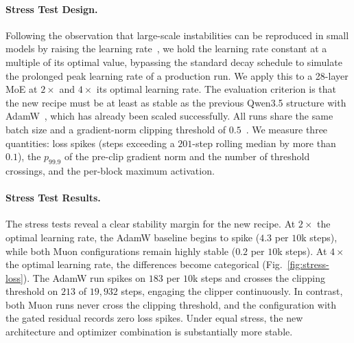 \paragraph{Stress Test Design.}
\label{sec:stability-method}
Following the observation that large-scale instabilities can be reproduced in small models by raising the learning rate~\citep{wortsman2023smallscale}, we hold the learning rate constant at a multiple of its optimal value, bypassing the standard decay schedule to simulate the prolonged peak learning rate of a production run. We apply this to a 28-layer MoE at $2\times$ and $4\times$ its optimal learning rate. The evaluation criterion is that the new recipe must be at least as stable as the previous Qwen3.5 structure with AdamW~\citep{qwenteam2026qwen35}, which has already been scaled successfully. 
All runs share the same batch size and a gradient-norm clipping threshold of $0.5$~\citep{pascanu2013clipping}. 
We measure three quantities: loss spikes (steps exceeding a $201$-step rolling median by more than $0.1$), the
$p_{99.9}$ of the pre-clip gradient norm and the number of threshold crossings, and the per-block maximum activation. 



\paragraph{Stress Test Results.}
\label{sec:stability-stress}
The stress tests reveal a clear stability margin for the new recipe. 
At $2\times$ the optimal learning rate, the AdamW baseline begins to spike ($4.3$ per $10$k steps), while both Muon configurations remain highly stable ($0.2$ per $10$k steps). 
At $4\times$ the optimal learning rate, the differences become categorical (Fig.~\ref{fig:stress-loss}). 
The AdamW run spikes on $183$ per $10$k steps and crosses the clipping threshold on $213$ of $19{,}932$ steps, engaging the clipper continuously. 
In contrast, both Muon runs never cross the clipping threshold, and the configuration with the gated residual records zero loss spikes. 
Under equal stress, the new architecture and optimizer combination is substantially more stable.

